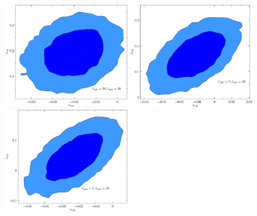 \documentclass[a4paper,11pt]{article}
\def \halffigwidth{0.48\textwidth}
\begin{document}
\begin{figure}
  \includegraphics[width = \halffigwidth]{ldip20to30_nrun_dipamp_2D.pdf}%
  \includegraphics[width = \halffigwidth]{ldip2to30_nrun_dipamp_2D.pdf}
  \includegraphics[width = \halffigwidth]{ldip2to40_nrun_dipamp_2D.pdf}%

\end{figure}
\end{document}
